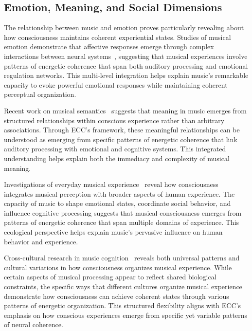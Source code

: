 \subsection*{Emotion, Meaning, and Social Dimensions}
The relationship between music and emotion proves particularly revealing about how consciousness maintains coherent experiential states. Studies of musical emotion demonstrate that affective responses emerge through complex interactions between neural systems~\cite{Thompson2010, kukushkin2024massed}, suggesting that musical experiences involve patterns of energetic coherence that span both auditory processing and emotional regulation networks. This multi-level integration helps explain music's remarkable capacity to evoke powerful emotional responses while maintaining coherent perceptual organization.

Recent work on musical semantics~\cite{Reybrouck2005, butlin2023consciousnessartificialintelligenceinsights} suggests that meaning in music emerges from structured relationships within conscious experience rather than arbitrary associations. Through ECC's framework, these meaningful relationships can be understood as emerging from specific patterns of energetic coherence that link auditory processing with emotional and cognitive systems. This integrated understanding helps explain both the immediacy and complexity of musical meaning.

Investigations of everyday musical experience~\cite{DeNora2000, hunt2024electromagnetic} reveal how consciousness integrates musical perception with broader aspects of human experience. The capacity of music to shape emotional states, coordinate social behavior, and influence cognitive processing suggests that musical consciousness emerges from patterns of energetic coherence that span multiple domains of experience. This ecological perspective helps explain music's pervasive influence on human behavior and experience.

Cross-cultural research in music cognition~\cite{Patel2010, van2025processes} reveals both universal patterns and cultural variations in how consciousness organizes musical experience. While certain aspects of musical processing appear to reflect shared biological constraints, the specific ways that different cultures organize musical experience demonstrate how consciousness can achieve coherent states through various patterns of energetic organization. This structured flexibility aligns with ECC's emphasis on how conscious experiences emerge from specific yet variable patterns of neural coherence.

